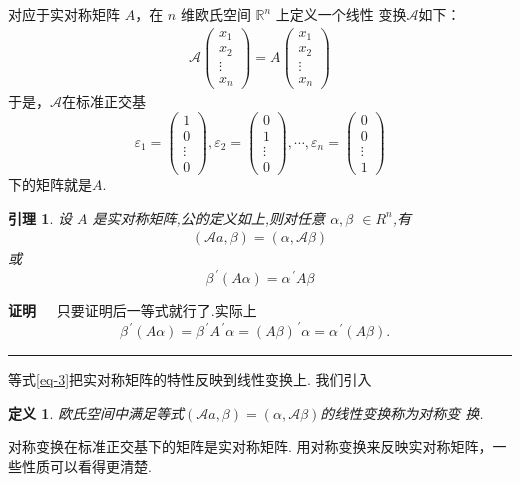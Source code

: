 \documentclass[13pt]{beamer}
\newtheorem{lem}{引理}
\newtheorem*{defi}{定义}
\def\qed{\nopagebreak\hfill{\rule{4pt}{7pt}}\medbreak}
\def\pf{{\bf 证明~~ }}
\def\Rn{\mathbb{R}^n}
\begin{document}
\begin{frame}

对应于实对称矩阵 $A$，在 $n$ 维欧氏空间 $\Rn$ 上定义一个线性 变换$\mathscr{A}$如下：
\begin{align}\label{eq-1}
\mathscr{A}\left(\begin{array}{c}
x_{1} \\
x_{2} \\
\vdots \\
x_{n}
\end{array}\right)={A}\left(\begin{array}{c}
x_{1} \\
x_{2} \\
\vdots \\
x_{n}
\end{array}\right)
\end{align}
于是，$\mathscr{A}$在标准正交基
\[
{\varepsilon}_{1}=\left(\begin{array}{c}
1 \\
0 \\
\vdots \\
0
\end{array}\right), {\varepsilon}_{2}=\left(\begin{array}{c}
0 \\
1 \\
\vdots \\
0
\end{array}\right), \cdots, {\varepsilon}_{n}=\left(\begin{array}{c}
0 \\
0 \\
\vdots \\
1
\end{array}\right)
\]
下的矩阵就是$A$. 
\end{frame}


\begin{frame}
\begin{lem}
设 $A$ 是实对称矩阵,公的定义如上,则对任意 ${\alpha}, {\beta}$ $\in {R}^{n}$,有
\begin{align}\label{eq-3}
(\mathscr{A} {a}, {\beta})=({\alpha}, \mathscr{A} {\beta})
\end{align}
或
\[
{\beta}^{\, \prime}({A} {\alpha})={\alpha}^{\, \prime} {A} {\beta}
\]
\end{lem}
\pf 只要证明后一等式就行了.实际上\\
$\qquad \qquad \qquad \qquad 
{\beta}^{\, \prime}({A} {\alpha})={\beta}^{\, \prime} {A}^{\, \prime} {\alpha}=({A} {\beta})^{\, \prime} {\alpha}={\alpha}^{\, \prime}({A} {\beta}).
$
\qed 
等式\eqref{eq-3}把实对称矩阵的特性反映到线性变换上. 我们引入
\begin{defi}
欧氏空间中满足等式$(\mathscr{A} {a}, {\beta})=({\alpha}, \mathscr{A} {\beta})$的线性变换称为对称变
换. 
\end{defi}
对称变换在标准正交基下的矩阵是实对称矩阵. 
用对称变换来反映实对称矩阵，一些性质可以看得更清楚.
\end{frame}
\end{document}
